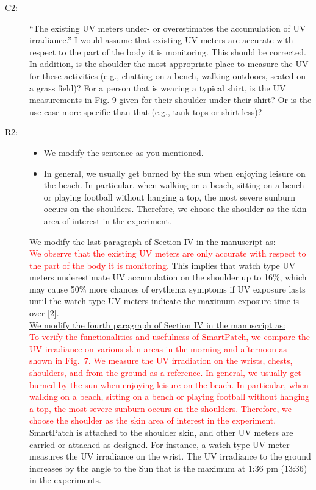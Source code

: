 \documentclass[onecolumn]{IEEEconf}
\begin{document}
\begin{description}
\item [C2: ] ``The existing UV meters under- or overestimates the accumulation of UV irradiance.'' I would assume that existing UV meters are accurate with respect to the part of the body it is monitoring. This should be corrected. In addition, is the shoulder the most appropriate place to measure the UV for these activities (e.g., chatting on a bench, walking outdoors, seated on a grass field)? For a person that is wearing a typical shirt, is the UV measurements in Fig. 9 given for their shoulder under their shirt? Or is the use-case more specific than that (e.g., tank tops or shirt-less)?
\item [R2: ] 
\begin{itemize}
\item We modify the sentence as you mentioned. 
\item In general, we usually get burned by the sun when enjoying leisure on the beach. In particular, when walking on a beach, sitting on a bench or playing football without hanging a top, the most severe sunburn occurs on the shoulders. Therefore, we choose the shoulder as the skin area of interest in the experiment.
\end{itemize}

\underline{We modify the last paragraph of Section IV in the manuscript as:}\\
\textcolor{red}{We observe that the existing UV meters are only accurate with respect to the part of the body it is monitoring.} This implies that watch type UV meters underestimate UV accumulation on the shoulder up to 16\%, which may cause 50\% more chances of erythema symptoms if UV exposure lasts until the watch type UV meters indicate the maximum exposure time is over [2].\\

\underline{We modify the fourth paragraph of Section IV in the manuscript as:}\\
\textcolor{red}{To verify the functionalities and usefulness of SmartPatch, we compare the UV irradiance on various skin areas in the morning and afternoon as shown in Fig.~7. We measure the UV irradiation on the wrists, chests, shoulders, and from the ground as a reference.
In general, we usually get burned by the sun when enjoying leisure on the beach. In particular, when walking on a beach, sitting on a bench or playing football without hanging a top, the most severe sunburn occurs on the shoulders. Therefore, we choose the shoulder as the skin area of interest in the experiment.}
SmartPatch is attached to the shoulder skin, and other UV meters are carried or attached as designed. For instance, a watch type UV meter measures the UV irradiance on the wrist. The UV irradiance to the ground increases by the angle to the Sun that is the maximum at 1:36 pm (13:36) in the experiments.\\
~\\


\end{description}
\end{document}
